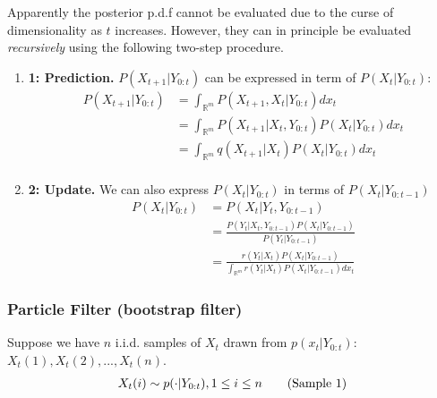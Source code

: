 \documentclass[11pt,a4paper]{article}
\begin{document}
Apparently the posterior p.d.f cannot be evaluated due to the curse of dimensionality as $t$ increases. However, they can in principle be evaluated \textit{recursively} using the following two-step procedure.

\begin{enumerate}
    \item \textbf{ 1: Prediction.} $P(X_{t+1}|Y_{0:t})$ can be expressed in term of $P(X_t|Y_{0:t})$:
    \begin{equation}
        \begin{aligned}
            P(X_{t+1}|Y_{0:t})&=\int_{\mathbb{R}^m}P(X_{t+1},X_t|Y_{0:t})dx_t\\
            &=\int_{\mathbb{R}^m}P(X_{t+1}|X_t, Y_{0:t})P(X_t|Y_{0:t})dx_t\\
            &=\int_{\mathbb{R}^m}q(X_{t+1}|X_t)P(X_t|Y_{0:t})dx_t\\
        \end{aligned}
        \nonumber
    \end{equation}
    \item \textbf{ 2: Update.} We can also express $P(X_t|Y_{0:t})$ in terms of $P(X_t|Y_{0:t-1})$
    \begin{equation}
        \begin{aligned}
            P(X_{t}|Y_{0:t})&=P(X_t|Y_{t},Y_{0:t-1})\\
            &=\frac{P(Y_t|X_t,Y_{0:t-1})P(X_t|Y_{0:t-1})}{P(Y_t|Y_{0:t-1})}\\
            &=\frac{r(Y_t|X_t)P(X_t|Y_{0:t-1})}{\int_{\mathbb{R}^m}r(Y_t|X_t)P(X_t|Y_{0:t-1})dx_t}
        \end{aligned}
        \nonumber
    \end{equation}
\end{enumerate}

\subsubsection{Particle Filter (bootstrap filter)}
Suppose we have $n$ i.i.d. samples of $X_t$ drawn from $p(x_t|Y_{0:t})$: $X_t(1),X_t(2),...,X_t(n)$.
\begin{equation}
    \begin{aligned}
        X_{t}(i)\sim p(\cdot|Y_{0:t}),1\leq i\leq n
    \end{aligned}
    \tag{\text{Sample 1}}
\end{equation}
\end{document}
